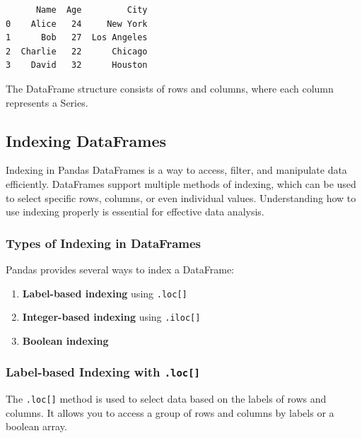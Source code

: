 \documentclass[
  letterpaper,
  DIV=11,
  numbers=noendperiod]{scrreprt}
\providecommand{\tightlist}{%
  \setlength{\itemsep}{0pt}\setlength{\parskip}{0pt}}\usepackage{longtable,booktabs,array}
\begin{document}
\begin{verbatim}
      Name  Age         City
0    Alice   24     New York
1      Bob   27  Los Angeles
2  Charlie   22      Chicago
3    David   32      Houston
\end{verbatim}

The DataFrame structure consists of rows and columns, where each column
represents a Series.

\hypertarget{indexing-dataframes}{%
\subsection{Indexing DataFrames}\label{indexing-dataframes}}

Indexing in Pandas DataFrames is a way to access, filter, and manipulate
data efficiently. DataFrames support multiple methods of indexing, which
can be used to select specific rows, columns, or even individual values.
Understanding how to use indexing properly is essential for effective
data analysis.

\hypertarget{types-of-indexing-in-dataframes}{%
\subsubsection{Types of Indexing in
DataFrames}\label{types-of-indexing-in-dataframes}}

Pandas provides several ways to index a DataFrame:

\begin{enumerate}
\def\labelenumi{\arabic{enumi}.}
\tightlist
\item
  \textbf{Label-based indexing} using \texttt{.loc{[}{]}}
\item
  \textbf{Integer-based indexing} using \texttt{.iloc{[}{]}}
\item
  \textbf{Boolean indexing}
\end{enumerate}

\hypertarget{label-based-indexing-with-.loc}{%
\subsubsection{\texorpdfstring{Label-based Indexing with
\texttt{.loc{[}{]}}}{Label-based Indexing with .loc{[}{]}}}\label{label-based-indexing-with-.loc}}

The \texttt{.loc{[}{]}} method is used to select data based on the
labels of rows and columns. It allows you to access a group of rows and
columns by labels or a boolean array.
\end{document}
